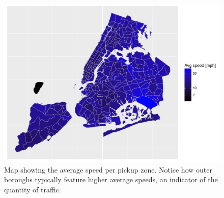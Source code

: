 \documentclass{acm_proc_article-sp-sigmod09}
\begin{document}
\begin{figure}
	\centering
	\includegraphics[width=1\columnwidth]{resources/base_plots/avg_speed_by_pickup_location_map.pdf}
	\caption{Map showing the average speed per pickup zone. Notice how outer boroughs typically feature higher average speeds, an indicator of the quantity of traffic.}
	\label{fig:speedMap}
\end{figure}
\end{document}
